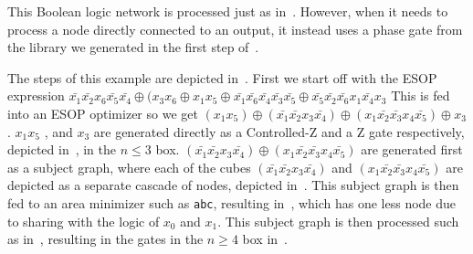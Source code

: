This Boolean logic network is processed just as in~. However, when it
needs to process a node directly connected to an output, it instead uses a phase gate
from the library we generated in the first step of~.

\begin{example}
  The steps of this example are depicted in~.
  First we start off with the ESOP expression $\bar{x_{1}} \bar{x_{2}} x_{6} \bar{x_{5}} \bar{x_{4}} \oplus (x_{3} x_{6} \oplus x_{1} x_{5} \oplus \bar{x_{1}} \bar{x_{6}} \bar{x_{4}} \bar{x_{3}} \bar{x_{5}} \oplus \bar{x_{5}} \bar{x_{2}} \bar{x_{6}} x_{1} \bar{x_{4}} x_{3}$
  This is fed into an ESOP optimizer so we get
  $(x_{1} x_{5}) \oplus (\bar{x_{1}} \bar{x_{2}} x_{3} \bar{x_{4}}) \oplus (x_{1} \bar{x_{2}} \bar{x_{3}} x_{4} \bar{x_{5}}) \oplus x_{3}$.
  $x_1 x_5$ , and $x_3$ are generated directly as a Controlled-Z and a Z gate respectively, depicted
  in~, in the $n \leq 3$ box.
  $(\bar{x_{1}} \bar{x_{2}} x_{3} \bar{x_{4}}) \oplus (x_{1} \bar{x_{2}} \bar{x_{3}} x_{4} \bar{x_{5}})$ are
  generated first as a subject graph, where each of the cubes $(\bar{x_{1}} \bar{x_{2}} x_{3} \bar{x_{4}})$
  and $(x_{1} \bar{x_{2}} \bar{x_{3}} x_{4} \bar{x_{5}})$ are
  depicted as a separate cascade of nodes, depicted in~.
  This subject graph is then fed to an area minimizer such as \texttt{abc}, resulting in~,
  which has one less node due to sharing with the logic of $x_0$ and $x_1$.
  This subject graph is then processed such as in~, resulting in the gates in the $n \geq 4$
  box in~.
\end{example}

